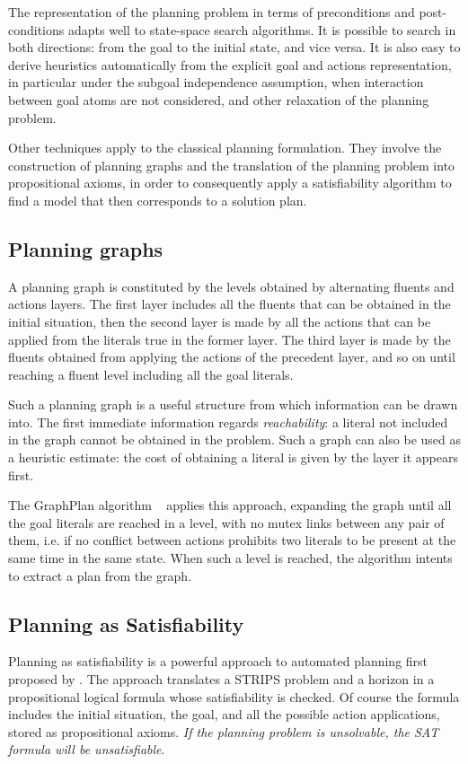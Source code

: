 The representation of the planning problem in terms of preconditions and post-conditions adapts well 
to state-space search algorithms. It is possible to search in both directions: from the goal to the initial state, and vice versa.
It is also easy to derive heuristics automatically from the explicit goal and actions representation,
in particular under the subgoal independence assumption, when interaction between goal atoms are not considered, 
and other relaxation of the planning problem.


Other techniques apply to the classical planning formulation. They involve the construction of planning graphs and the
 translation of the planning problem into propositional axioms, in order to consequently apply 
a satisfiability algorithm to find a model that then corresponds to a solution plan.

\subsection{Planning graphs}
A planning graph is constituted by the levels obtained by alternating fluents and actions layers.
The first layer includes all the fluents that can be obtained in the initial situation, then the second layer
is made by all the actions that can be applied from the literals true in the former layer. The third layer is 
made by the fluents obtained from applying the actions of the precedent layer, and so on until reaching a 
fluent level including all the goal literals.

Such a planning graph is a useful structure from which information can be drawn into. 
The first immediate information regards \emph{reachability}: a literal not included in the graph cannot be obtained in the problem.
Such a graph can also be used as a heuristic estimate: the cost of obtaining a literal is given by the layer it appears first.

The GraphPlan algorithm ~\citep{blum:graphplan,rao:graphplan,anderson:conditional,weld:cgp} applies this approach, expanding the graph until all the  goal literals are reached in a level, 
with no mutex links between any pair of them, i.e. if no conflict between actions prohibits two literals to be present at the same time in the same state.
When such a level is reached, the algorithm intents to extract a plan from the graph.

\subsection{Planning as Satisfiability}
Planning as satisfiability is a powerful approach to automated planning first proposed by \citet{kautz:ecai92}.
The approach translates a STRIPS problem and a horizon in a propositional logical formula whose satisfiability is checked.
Of course the formula includes the initial situation, the goal, and all the possible action applications, stored as propositional axioms.
%
\emph{If the planning problem is unsolvable, the SAT formula will be unsatisfiable}.

